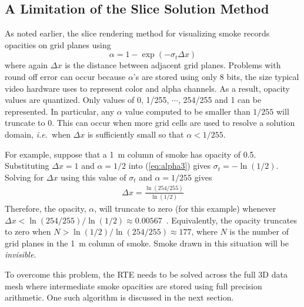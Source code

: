 {%

\subsection{A Limitation of the Slice Solution Method}
As noted earlier, the slice rendering method for visualizing smoke records opacities on grid planes using
\begin{equation}
\label{eq:alpha3}
\alpha=1-\exp(-\sigma_t\Delta x)
\end{equation}
where again $\Delta x$ is the distance between adjacent grid planes.  Problems with round off error can occur because $\alpha$'s are stored using only 8 bits, the size typical video hardware uses to represent color and alpha channels.
As a result, opacity values are quantized.  Only values of 0, 1/255, $\cdots$, 254/255 and 1 can be represented.  In particular, any $\alpha$ value computed to be smaller than $1/255$ will truncate to 0.
This can occur when more grid cells are used to resolve a solution domain, {\em i.e.}\ when $\Delta x$ is sufficiently small so that $\alpha<1/255$.

For example, suppose that a 1~m column of smoke has opacity of 0.5.  Substituting $\Delta x=1$ and $\alpha=1/2$ into (\ref{eq:alpha3}) gives $\sigma_t=-\ln(1/2)$.  Solving for $\Delta x$ using this value of $\sigma_t$ and $\alpha=1/255$ gives
\begin{eqnarray*}
\Delta x = \frac{\ln(254/255)}{\ln(1/2)}
\end{eqnarray*}
Therefore, the opacity, $\alpha$, will truncate to zero (for this example) whenever $\Delta x<\ln(254/255)/\ln(1/2)\approx 0.00567$~.  Equivalently, the opacity truncates to zero when $N>\ln(1/2)/\ln(254/255)\approx 177$, where $N$ is the number of grid planes in the 1~m column of smoke.  Smoke drawn in this situation will be {\em invisible}.

To overcome this problem, the RTE needs to be solved across the full 3D data mesh where intermediate smoke opacities are stored using full precision arithmetic.  One such algorithm is discussed in the next section.


}

